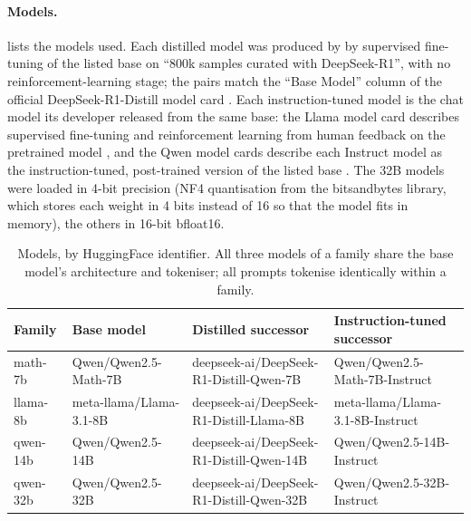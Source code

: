 \documentclass[10pt]{article}
\begin{document}
\paragraph{Models.}  lists the models used. Each distilled model was produced by \citet{deepseek2025} by supervised fine-tuning of the listed base on ``800k samples curated with DeepSeek-R1'', with no reinforcement-learning stage; the pairs match the ``Base Model'' column of the official DeepSeek-R1-Distill model card \citep{r1card}. Each instruction-tuned model is the chat model its developer released from the same base: the Llama model card describes supervised fine-tuning and reinforcement learning from human feedback on the pretrained model \citep{llama31card}, and the Qwen model cards describe each Instruct model as the instruction-tuned, post-trained version of the listed base \citep{qwen25cards}. The 32B models were loaded in 4-bit precision (NF4 quantisation from the bitsandbytes library, which stores each weight in 4 bits instead of 16 so that the model fits in memory), the others in 16-bit bfloat16.

\begin{table}[t]
\centering
\footnotesize
\setlength{\tabcolsep}{4pt}
\begin{tabular}{llll}
\toprule
Family & Base model & Distilled successor & Instruction-tuned successor \\
\midrule
math-7b & Qwen/Qwen2.5-Math-7B & deepseek-ai/DeepSeek-R1-Distill-Qwen-7B & Qwen/Qwen2.5-Math-7B-Instruct \\
llama-8b & meta-llama/Llama-3.1-8B & deepseek-ai/DeepSeek-R1-Distill-Llama-8B & meta-llama/Llama-3.1-8B-Instruct \\
qwen-14b & Qwen/Qwen2.5-14B & deepseek-ai/DeepSeek-R1-Distill-Qwen-14B & Qwen/Qwen2.5-14B-Instruct \\
qwen-32b & Qwen/Qwen2.5-32B & deepseek-ai/DeepSeek-R1-Distill-Qwen-32B & Qwen/Qwen2.5-32B-Instruct \\
\bottomrule
\end{tabular}
\caption{Models, by HuggingFace identifier. All three models of a family share the base model's architecture and tokeniser; all prompts tokenise identically within a family.}
\label{tab:models}
\end{table}
\end{document}
